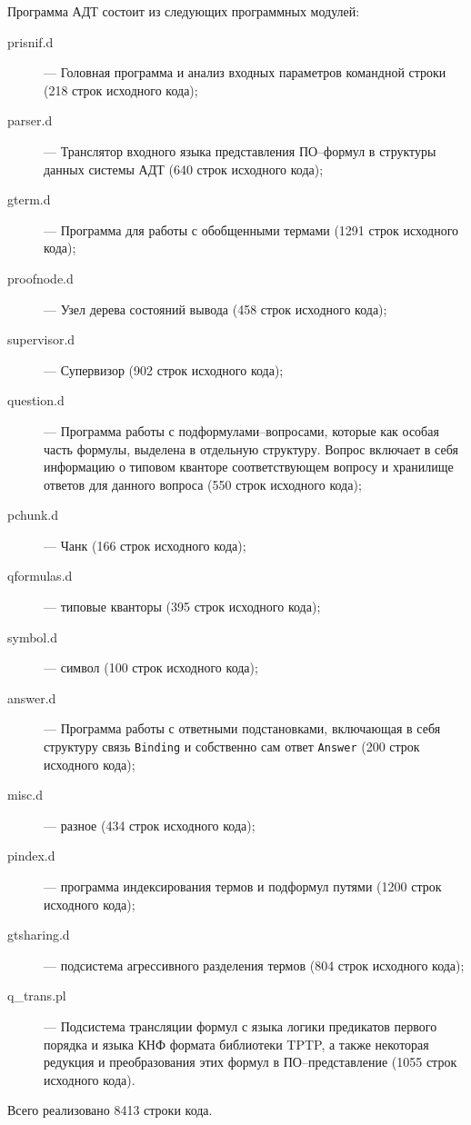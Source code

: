 Программа АДТ состоит из следующих программных модулей:
\begin{description}
\item[prisnif.d] --- Головная программа и анализ входных параметров командной строки (218 строк исходного кода);
\item[parser.d] --- Транслятор входного языка представления ПО--формул в структуры данных системы АДТ (640 строк исходного кода);
\item[gterm.d] --- Программа для работы с обобщенными термами (1291 строк исходного кода);
\item[proofnode.d] --- Узел дерева состояний вывода (458 строк исходного кода);
\item[supervisor.d] --- Супервизор (902 строк исходного кода);
\item[question.d] --- Программа работы с подформулами--вопросами, которые как особая часть формулы, выделена в отдельную структуру. Вопрос включает в себя информацию о типовом кванторе соответствующем вопросу и хранилище ответов для данного вопроса (550 строк исходного кода);
\item[pchunk.d] --- Чанк (166 строк исходного кода);
\item[qformulas.d] --- типовые кванторы (395 строк исходного кода);
\item[symbol.d] --- символ (100 строк исходного кода);
\item[answer.d] --- Программа работы с ответными подстановками, включающая в себя структуру связь \texttt{Binding} и собственно сам ответ \texttt{Answer} (200 строк исходного кода);
\item[misc.d] --- разное (434 строк исходного кода);
\item[pindex.d] --- программа индексирования термов и подформул путями (1200 строк исходного кода);
\item[gtsharing.d] --- подсистема агрессивного разделения термов (804 строк исходного кода);
\item[q\_trans.pl] --- Подсистема трансляции формул с языка логики предикатов первого порядка и языка КНФ формата библиотеки TPTP, а также некоторая редукция и преобразования этих формул в ПО--представление (1055 строк исходного кода).
\end{description}
Всего реализовано 8413 строки кода.




